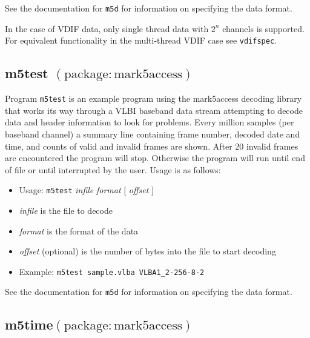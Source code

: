 See the documentation for {\tt m5d} for information on specifying the data format.

In the case of VDIF data, only single thread data with $2^n$ channels is supported.
For equivalent functionality in the multi-thread VDIF case see {\tt vdifspec}.






\subsection{m5test {\small $\mathrm{(package: mark5access)}$}} \label{sec:m5test}

Program {\tt m5test} is an example program using the mark5access decoding library that works its way through a VLBI baseband data stream attempting to decode data and header information to look for problems.
Every million samples (per baseband channel) a summary line containing frame number, decoded date and time, and counts of valid and invalid frames are shown.
After 20 invalid frames are encountered the program will stop.  
Otherwise the program will run until end of file or until interrupted by the user.
Usage is as follows:

\begin{itemize}
\item[] Usage: {\tt m5test} {\em infile} {\em format} $[$ {\em offset} $]$ 
\item[] {\em infile} is the file to decode
\item[] {\em format} is the format of the data
\item[] {\em offset} (optional) is the number of bytes into the file to start decoding
\item[] Example: {\tt m5test sample.vlba VLBA1\_2-256-8-2}
\end{itemize}

See the documentation for {\tt m5d} for information on specifying the data format.






\subsection{m5time{\small $\mathrm{(package: mark5access)}$}} \label{sec:m5time}

